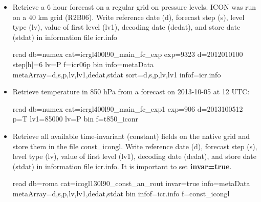 \begin{itemize}
\item Retrieve a 6 hour forecast on a regular grid on pressure levels. ICON was run on a 40 km
grid (R2B06).  Write reference date (d),
forecast step (s), level type (lv), value of first level (lv1), decoding date (dedat), and
store date (stdat) in information file icr.info
\begin{skydb}
read db=numex cat=icrgl400l90_main_fc_exp exp=9323 d=2012010100 step[h]=6 lv=P f=icr06p bin info=metaData metaArray=d,s,p,lv,lv1,dedat,stdat sort=d,s,p,lv,lv1 infof=icr.info
\end{skydb}

\item Retrieve temperature in 850 hPa from a forecast on 2013-10-05 at 12 UTC:

\begin{skydb}
read db=numex cat=icrgl400l90_main_fc_exp1 exp=906 d=2013100512 p=T lv1=85000 lv=P bin f=t850_iconr
\end{skydb}

\item Retrieve all available time-invariant (constant) fields on the native grid and store them in the file const\_icongl. 
Write reference date (d), forecast step (s), level type (lv), value of first level (lv1), decoding date (dedat), 
and store date (stdat) in information file icr.info. It is important to set \textbf{invar=true}.

\begin{skydb}
read db=roma cat=icogl130l90_const_an_rout invar=true info=metaData metaArray=d,s,p,lv,lv1,dedat,stdat bin infof=icr.info f=const_icongl
\end{skydb}

\end{itemize}
